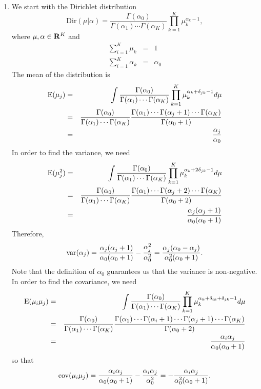 \begin{enumerate}
\item We start with the Dirichlet distribution
\[
\mathrm{Dir}(\mu|\alpha) = \frac{\Gamma(\alpha_0)}{\Gamma(\alpha_1)\cdots\Gamma(\alpha_K)}\prod_{k=1}^K\mu_k^{\alpha_k - 1},
\]
where $\mu, \alpha \in \mathbf{R}^K$ and
\begin{eqnarray*}
\sum_{i=1}^K \mu_k &=& 1 \\
\sum_{i=1}^K \alpha_k &=& \alpha_0
\end{eqnarray*}
The mean of the distribution is
\begin{eqnarray*}
\operatorname{E}(\mu_j) &=& \int\frac{\Gamma(\alpha_0)}{\Gamma(\alpha_1)\cdots\Gamma(\alpha_K)}\prod_{k=1}^K\mu_k^{\alpha_k + \delta_{jk} - 1}d\mu \\
 &=& \frac{\Gamma(\alpha_0)}{\Gamma(\alpha_1)\cdots\Gamma(\alpha_K)}\frac{\Gamma(\alpha_1)\cdots\Gamma(\alpha_j+1)\cdots\Gamma(\alpha_K)}{\Gamma(\alpha_0 + 1)} \\
 &=& \frac{\alpha_j}{\alpha_0}
\end{eqnarray*}
In order to find the variance, we need
\begin{eqnarray*}
\operatorname{E}(\mu_j^2) &=& \int\frac{\Gamma(\alpha_0)}{\Gamma(\alpha_1)\cdots\Gamma(\alpha_K)}\prod_{k=1}^K\mu_k^{\alpha_k + 2\delta_{jk} - 1}d\mu \\
 &=& \frac{\Gamma(\alpha_0)}{\Gamma(\alpha_1)\cdots\Gamma(\alpha_K)}\frac{\Gamma(\alpha_1)\cdots\Gamma(\alpha_j+2)\cdots\Gamma(\alpha_K)}{\Gamma(\alpha_0 + 2)} \\
 &=& \frac{\alpha_j(\alpha_j+1)}{\alpha_0(\alpha_0+1)}
\end{eqnarray*}
Therefore,
\[
\operatorname{var}(\alpha_j) = \frac{\alpha_j(\alpha_j+1)}{\alpha_0(\alpha_0+1)} - \frac{\alpha_j^2}{\alpha_0^2} = \frac{\alpha_j(\alpha_0 - \alpha_j)}{\alpha_0^2(\alpha_0+1)}.
\]
Note that the definition of $\alpha_0$ guarantees us that the variance is non-negative. In order
to find the covariance, we need
\begin{eqnarray*}
\operatorname{E}(\mu_i\mu_j) &=& \int\frac{\Gamma(\alpha_0)}{\Gamma(\alpha_1)\cdots\Gamma(\alpha_K)}\prod_{k=1}^K\mu_k^{\alpha_k + \delta_{ik} + \delta_{jk} - 1}d\mu \\
 &=& \frac{\Gamma(\alpha_0)}{\Gamma(\alpha_1)\cdots\Gamma(\alpha_K)}\frac{\Gamma(\alpha_1)\cdots\Gamma(\alpha_i+1)\cdots\Gamma(\alpha_j+1)\cdots\Gamma(\alpha_K)}{\Gamma(\alpha_0 + 2)} \\
 &=& \frac{\alpha_i\alpha_j}{\alpha_0(\alpha_0+1)}
\end{eqnarray*}
so that
\[
\operatorname{cov}(\mu_i\mu_j) = \frac{\alpha_i\alpha_j}{\alpha_0(\alpha_0+1)} - \frac{\alpha_i\alpha_j}{\alpha_0^2} = -\frac{\alpha_i\alpha_j}{\alpha_0^2(\alpha_0+1)}.
\]


\end{enumerate}
